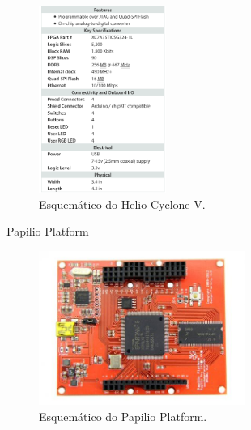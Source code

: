     \begin{frame}%
        \begin{figure}[h]
        \centering
        \includegraphics[width=0.37\textwidth]{img/imobilis/arty3.png}
        \caption{Esquemático do Helio Cyclone V.}
        \label{fig:arty3}
        \end{figure}
    \end{frame}



    \begin{frame}{Papilio Platform}
        \begin{figure}[h]
            \centering
            \includegraphics[width=0.6\textwidth]{img/imobilis/papilio.jpeg}
            \caption{Esquemático do Papilio Platform.}
            \label{fig:papilio}
        \end{figure}
    \end{frame}